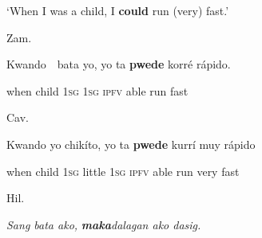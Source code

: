 \setcounter{listWWNumiileveli}{0}
\begin{listWWNumiileveli}
\item 
\begin{stylelsLanginfo}
\label{bkm:Ref52810347}‘When I was a child, I \textbf{could} run (very) fast.’
\end{stylelsLanginfo}


\setcounter{listWWNumiilevelii}{0}
\begin{listWWNumiilevelii}
\item 
\begin{stylelsLanginfo}
Zam.
\end{stylelsLanginfo}
\end{listWWNumiilevelii}
\end{listWWNumiileveli}
\begin{stylelsSourceline}
Kwando\ \ bata yo, yo ta \textbf{pwede} korr\'{e} r\'{a}pido.
\end{stylelsSourceline}

\begin{stylelsIMT}
when child 1\textsc{sg} 1\textsc{sg} \textsc{ipfv} able run fast
\end{stylelsIMT}

\begin{listWWNumiileveli}
\item 
\begin{listWWNumiilevelii}
\item 
\begin{stylelsLanginfo}
Cav.
\end{stylelsLanginfo}
\end{listWWNumiilevelii}
\end{listWWNumiileveli}
\begin{stylelsSourceline}
Kwando yo chik\'{i}to, yo ta \textbf{pwede} kurrí muy r\'{a}pido
\end{stylelsSourceline}

\begin{stylelsIMT}
when child 1\textsc{sg} little 1\textsc{sg} \textsc{ipfv} able run very fast
\end{stylelsIMT}

\begin{listWWNumiileveli}
\item 
\begin{listWWNumiilevelii}
\item 
\begin{stylelsLanginfo}
Hil.
\end{stylelsLanginfo}
\end{listWWNumiilevelii}
\end{listWWNumiileveli}
\begin{stylelsIMT}
\textit{Sang bata ako, }\textbf{\textit{maka}}\textit{dalagan ako dasig.}
\end{stylelsIMT}

